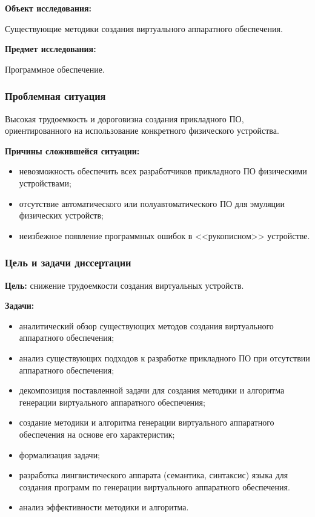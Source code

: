 \begin{frame}%
    \begin{center}
        \textbf{Объект исследования:}

        Существующие методики создания виртуального аппаратного
        обеспечения.

        \textbf{Предмет исследования:}

        Программное обеспечение.
    \end{center}
\end{frame}


\begin{frame}%
    \frametitle{Проблемная ситуация}

    Высокая трудоемкость и дороговизна создания прикладного ПО, ориентированного
    на использование конкретного физического устройства.

    \textbf{Причины сложившейся ситуации:}
    \begin{itemize}
        \item невозможность обеспечить всех разработчиков прикладного ПО физическими устройствами;
        \item отсутствие автоматического или полуавтоматического ПО для эмуляции физических устройств;
        \item неизбежное появление программных ошибок в <<рукописном>> устройстве.
    \end{itemize}
\end{frame}


\begin{frame}%
    \frametitle{Цель и задачи диссертации}
    \textbf{Цель:} снижение трудоемкости создания виртуальных устройств.

    \textbf{Задачи:}
    \begin{itemize}
        \item аналитический обзор существующих методов создания виртуального аппаратного обеспечения;
        \item анализ существующих подходов к разработке прикладного ПО при отсутствии аппаратного обеспечения;
        \item декомпозиция поставленной задачи для создания методики и алгоритма генерации виртуального аппаратного обеспечения;
        \item создание методики и алгоритма генерации виртуального аппаратного обеспечения на основе его характеристик;
        \item формализация задачи;
        \item разработка лингвистического аппарата (семантика, синтаксис) языка для создания программ по генерации виртуального
            аппаратного обеспечения.
        \item анализ эффективности методики и алгоритма.
    \end{itemize}
\end{frame}


